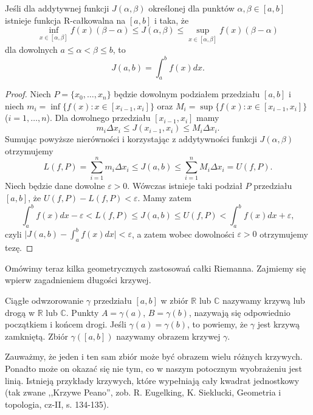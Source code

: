 \documentclass[leqno]{article}
\begin{document}
\begin{justify}
\begin{theorem}
{
    Jeśli dla addytywnej funkcji $J(\alpha, \beta)$ określonej dla punktów $\alpha, \beta \in [a,b]$ istnieje
    funkcja R-całkowalna na $[a,b]$ i taka, że 
    \[
        \inf_{x \in [\alpha, \beta]} f(x)(\beta - \alpha) \leqslant J(\alpha, \beta) \leqslant \sup_{x \in [\alpha, \beta]} f(x)(\beta - \alpha)
    \]
    dla dowolnych $a \leqslant \alpha < \beta \leqslant b$, to
    \[
        J(a,b) = \int_{a}^{b}f(x)dx.
    \]
}
\end{theorem}

\begin{proof}
    Niech $ P = \{x_0, \ldots, x_n\}$ będzie dowolnym podziałem przedziału $[a,b]$ i niech
    $m_i = \inf\{f(x) : x \in [x_{i-1}, x_i]\}$ oraz $M_i = \sup\{f(x) : x \in [x_{i-1}, x_i]\}$ ($i = 1, \ldots, n$).
    Dla dowolnego przedziału $[x_{i-1}, x_i]$ mamy 
    \[
        m_i \Delta x_i \leqslant J(x_{i-1}, x_i) \leqslant M_i \Delta x_i.
    \]
    Sumując powyższe nierówności i korzystając z addytywności funkcji $J(\alpha, \beta)$ otrzymujemy
    \[
        L(f, P) = \sum_{i=1}^{n}m_i \Delta x_i \leqslant J(a,b) \leqslant \sum_{i = 1}^{n}M_i \Delta x_i = U(f, P).
    \]
    Niech będzie dane dowolne $\varepsilon > 0$. Wówczas istnieje taki podział $P$ przedziału $[a,b]$, że
    $U(f, P) - L(f, P) < \varepsilon$. Mamy zatem
    \[
        \int_{a}^{b}f(x)dx - \varepsilon < L(f, P) \leqslant J(a,b) \leqslant U(f, P) < \int_{a}^{b}f(x)dx + \varepsilon,
    \]
    czyli $\big|J(a,b) - \int_{a}^{b}f(x)dx \big| < \varepsilon$, a zatem wobec dowolności $\varepsilon > 0$ otrzymujemy tezę.
\end{proof}

Omówimy teraz kilka geometrycznych zastosowań całki Riemanna. Zajmiemy się wpierw zagadnieniem długości krzywej.

\begin{defn}
    Ciągłe odwzorowanie $\gamma$ przedziału $[a,b]$ w zbiór $\mathbb{R}$ lub $\mathbb{C}$ nazywamy krzywą
    lub drogą w $\mathbb{R}$ lub $\mathbb{C}$. Punkty $A = \gamma(a)$, $B = \gamma(b)$, nazywają się odpowiednio
    początkiem i końcem drogi. Jeśli $\gamma(a) = \gamma(b)$, to powiemy, że $\gamma$ jest krzywą zamkniętą.
    Zbiór $\gamma([a,b])$ nazywamy obrazem krzywej $\gamma$. 
\end{defn}

\begin{uwaga}
    Zauważmy, że jeden i ten sam zbiór może być obrazem wielu różnych krzywych.
    Ponadto może on okazać się nie tym, co w naszym potocznym wyobrażeniu jest linią.
    Istnieją przykłady krzywych, które wypełniają cały kwadrat jednostkowy (tak zwane ,,Krzywe Peano'',
    zob. R. Eugelking, K. Sieklucki, Geometria i topologia, cz-II, s. 134-135).
\end{uwaga}


\end{justify}
\end{document}
